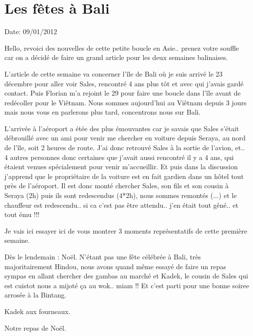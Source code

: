 \section{Les fêtes à Bali}

Date: 09/01/2012

\begin{multicols}{2}

Hello, revoici des nouvelles de cette petite boucle en Asie.. prenez votre souffle car on a décidé de faire un grand article pour les deux semaines balinaises.

L'article de cette semaine va concerner l'île de Bali où je suis arrivé le 23 décembre pour aller voir Sales, rencontré 4 ans plus tôt et avec qui j'avais gardé contact. Puis Florian m'a rejoint le 29 pour faire une boucle dans l'île avant de redécoller pour le Viêtnam. Nous sommes aujourd'hui au Viêtnam depuis 3 jours mais nous vous en parlerons plus tard, concentrons nous sur Bali.

L'arrivée à l'aéroport a étée des plus émouvantes car je savais que Sales s'était débrouillé avec un ami pour venir me chercher en voiture depuis Seraya, au nord de l'île, soit 2 heures de route. J'ai donc retrouvé Sales à la sortie de l'avion, et.. 4 autres personnes donc certaines que j'avait aussi rencontré il y a 4 ans, qui étaient venues spécialement pour venir m'accueillir. Et puis dans la discussion j'apprend que le propriétaire de la voiture est en fait gardien dans un hôtel tout près de l'aéroport. Il est donc monté chercher Sales, son fils et son cousin à Seraya (2h) puis ils sont redescendus (4*2h), nous sommes remontés (...) et le chauffeur est redescendu.. si ca c'est pas être attendu.. j'en était tout gêné.. et tout ému !!!

Je vais ici essayer ici de vous montrer 3 moments représentatifs de cette première semaine.

Dès le lendemain : Noël. N'étant pas une fête célébrée à Bali, très majoritairement Hindou, nous avons quand même essayé de faire un repas sympas en allant chercher des gambas au marché et Kadek, le cousin de Sales qui est cuistot nous a mijoté ça au wok.. miam !! Et c'est parti pour une bonne soiree arrosée à la Bintang.

Kadek aux fourneaux.


Notre repas de Noël.


\end{multicols}
